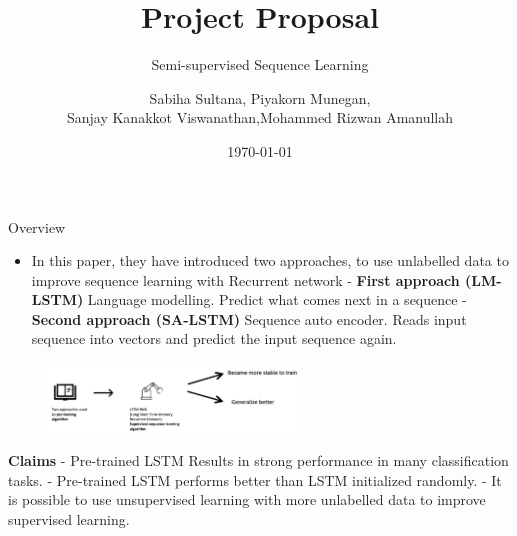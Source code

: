 \documentclass[aspectratio=169,xcolor=dvipsnames]{beamer}
\title[short title]{Project Proposal}
\subtitle{Semi-supervised Sequence Learning}
\author[Sanjay K V] {Sabiha Sultana\inst{1}, Piyakorn Munegan\inst{2},\\ Sanjay Kanakkot Viswanathan\inst{3},\break Mohammed Rizwan Amanullah\inst{4}}
\institute[NTU] %
{
    Department of Computing, \\
    Macquarie University 
    \vskip 3pt
}
\date{\today} %
\begin{document}
\begin{frame}
    \titlepage
\end{frame}

\begin{frame}{Overview}
    \tableofcontents
\begin{itemize}
        \item In this paper, they have introduced two approaches, to use unlabelled data to improve sequence learning with Recurrent network \break
        - \textbf{First approach (LM-LSTM)} Language modelling. Predict what comes next in a sequence \break
        - \textbf{Second approach (SA-LSTM)} Sequence auto encoder.  Reads input sequence into vectors and predict the input sequence again.
    \end{itemize}

  \begin{figure}
  \includegraphics[width=250]{Project Proposal Presentation.png}
\end{figure}
\textbf{Claims}
        - Pre-trained LSTM Results in strong performance in many classification tasks.\break
        - Pre-trained LSTM performs better than LSTM initialized randomly. \break
        - It is possible to use unsupervised learning with more unlabelled data to improve supervised learning.
 
  
\end{frame}
\end{document}
